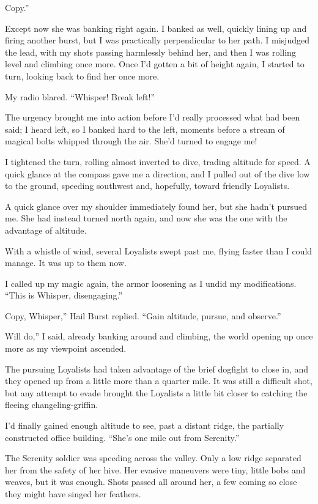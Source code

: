 \leavevmode{}Copy.”

Except now she was banking right again. I banked as well, quickly lining up and firing another burst, but I was practically perpendicular to her path. I misjudged the lead, with my shots passing harmlessly behind her, and then I was rolling level and climbing once more. Once I’d gotten a bit of height again, I started to turn, looking back to find her once more.

My radio blared. “Whisper! Break left!”

The urgency brought me into action before I’d really processed what had been said; I heard left, so I banked hard to the left, moments before a stream of magical bolts whipped through the air. She’d turned to engage me!

I tightened the turn, rolling almost inverted to dive, trading altitude for speed. A quick glance at the compass gave me a direction, and I pulled out of the dive low to the ground, speeding southwest and, hopefully, toward friendly Loyalists.

A quick glance over my shoulder immediately found her, but she hadn’t pursued me. She had instead turned north again, and now she was the one with the advantage of altitude.

With a whistle of wind, several Loyalists swept past me, flying faster than I could manage. It was up to them now.

I called up my magic again, the armor loosening as I undid my modifications. “This is Whisper, disengaging.”

\leavevmode{}Copy, Whisper,” Hail Burst replied. “Gain altitude, pursue, and observe.”

\leavevmode{}Will do,” I said, already banking around and climbing, the world opening up once more as my viewpoint ascended.

The pursuing Loyalists had taken advantage of the brief dogfight to close in, and they opened up from a little more than a quarter mile. It was still a difficult shot, but any attempt to evade brought the Loyalists a little bit closer to catching the fleeing changeling-griffin.

I’d finally gained enough altitude to see, past a distant ridge, the partially constructed office building. “She’s one mile out from Serenity.”

The Serenity soldier was speeding across the valley. Only a low ridge separated her from the safety of her hive. Her evasive maneuvers were tiny, little bobs and weaves, but it was enough. Shots passed all around her, a few coming so close they might have singed her feathers.

